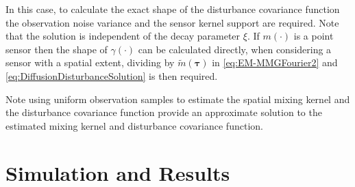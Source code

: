 \documentclass[10pt,twocolumn,twoside]{IEEEtran}
\begin{document}
In this case, to calculate the exact shape of the disturbance covariance function the observation noise variance and the sensor kernel support are required.
Note that the solution is independent of the decay parameter $\xi$.
If $m(\cdot)$ is a point sensor then the shape of $\gamma(\cdot)$ can be calculated directly, when considering a sensor with a spatial extent, dividing by $\tilde{m}(\boldsymbol\tau)$ in \eqref{eq:EM-MMGFourier2} and \eqref{eq:DiffusionDisturbanceSolution}  is then required.

Note using uniform observation samples to estimate the spatial mixing kernel and the disturbance covariance function provide an approximate solution to the estimated  mixing kernel and disturbance covariance function.

\section{Simulation and Results}
\end{document}
